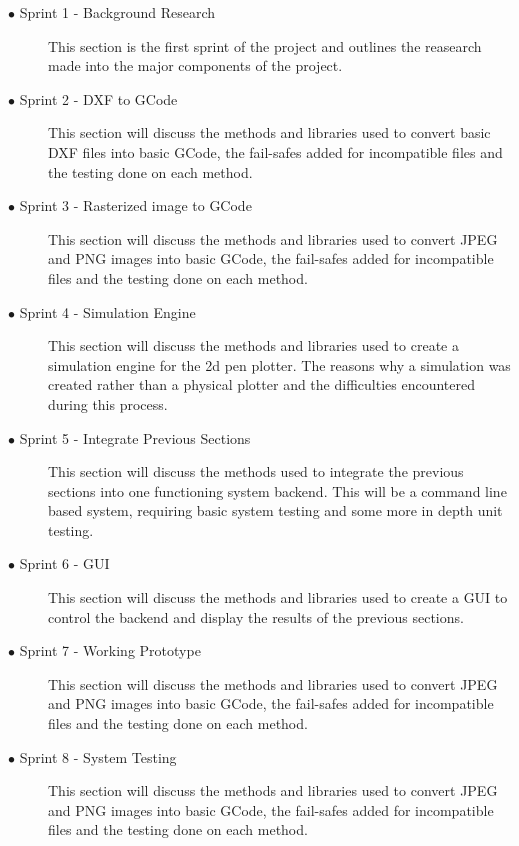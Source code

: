 		\begin{description}	
		
			\item[$\bullet$ Sprint 1 - Background Research]\hfill
			
			This section is the first sprint of the project and outlines the reasearch made into the major components of the project.
			
			\item[$\bullet$ Sprint 2 - DXF to GCode]\hfill
			
			This section will discuss the methods and libraries used to convert basic DXF files into basic GCode, the fail-safes added for incompatible files and the testing done on each method.
			
			\item[$\bullet$ Sprint 3 - Rasterized image to GCode]\hfill
						
			This section will discuss the methods and libraries used to convert JPEG and PNG images into basic GCode, the fail-safes added for incompatible files and the testing done on each method.

			\item[$\bullet$ Sprint 4 - Simulation Engine]\hfill
						
			This section will discuss the methods and libraries used to create a simulation engine for the 2d pen plotter. The reasons why a simulation was created rather than a physical plotter and the difficulties encountered during this process.

			\item[$\bullet$ Sprint 5 - Integrate Previous Sections]\hfill
						
			This section will discuss the methods used to integrate the previous sections into one functioning system backend. This will be a command line based system, requiring basic system testing and some more in depth unit testing.

			\item[$\bullet$ Sprint 6 - GUI]\hfill
						
			This section will discuss the methods and libraries used to create a GUI to control the backend and display the results of the previous sections.

			\item[$\bullet$ Sprint 7 - Working Prototype]\hfill
						
			This section will discuss the methods and libraries used to convert JPEG and PNG images into basic GCode, the fail-safes added for incompatible files and the testing done on each method.

			\item[$\bullet$ Sprint 8 - System Testing]\hfill
						
			This section will discuss the methods and libraries used to convert JPEG and PNG images into basic GCode, the fail-safes added for incompatible files and the testing done on each method.
			
		\end{description}